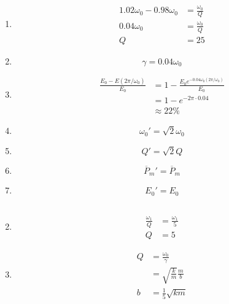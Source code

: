 \documentclass{article}
\begin{document}
\subsection{}

\begin{enumerate}
  \item

        \begin{align*}
          1.02 \omega_0 - 0.98 \omega_0 & = \frac{\omega_0}{Q} \\
          0.04 \omega_0                 & = \frac{\omega_0}{Q} \\
          Q                             & = 25
        \end{align*}

  \item \[\gamma = 0.04 \omega_0\]

  \item

        \begin{align*}
          \frac{E_0 - E(2 \pi / \omega_0)}{E_0} & = 1 - \frac{E_0 e^{-0.04 \omega_0 (2 \pi / \omega_0)}}{E_0} \\
                                                & = 1 - e^{-2 \pi \cdot 0.04}                                 \\
                                                & \approx 22\%
        \end{align*}

  \item \[\omega_0' = \sqrt{2} \omega_0\]

  \item \[Q' = \sqrt{2} Q\]

  \item \[\overline{P}_m' = \overline{P}_m\]

  \item \[E_0' = E_0\]
\end{enumerate}

\subsection{}

\begin{enumerate}
  \setcounter{enumi}{1}
  \item

        \begin{align*}
          \frac{\omega_1}{Q} & = \frac{\omega_1}{5} \\
          Q                  & = 5
        \end{align*}

  \item

        \begin{align*}
          Q & = \frac{\omega_0}{\gamma}        \\
            & = \sqrt{\frac{k}{m}} \frac{m}{b} \\
          b & = \frac{1}{5} \sqrt{k m}
        \end{align*}
\end{enumerate}
\end{document}
